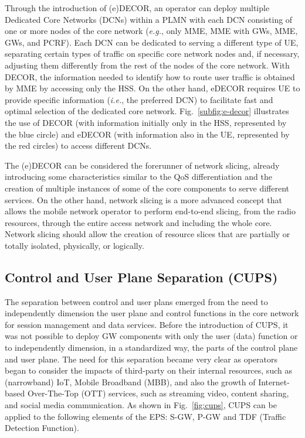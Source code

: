 Through the introduction of (e)DECOR, an operator can deploy multiple Dedicated Core Networks (DCNs) within a PLMN with each DCN consisting of one or more nodes of the core network (\textit{e.g.}, only MME, MME with GWs, MME, GWs, and PCRF). Each DCN can be dedicated to serving a different type of UE, separating certain types of traffic on specific core network nodes and, if necessary, adjusting them differently from the rest of the nodes of the core network. With DECOR, the information needed to identify how to route user traffic is obtained by MME by accessing only the HSS. On the other hand, eDECOR requires UE to provide specific information (\textit{i.e.}, the preferred DCN) to facilitate fast and optimal selection of the dedicated core network. Fig.~\ref{subfig:e-decor} illustrates the use of DECOR (with information initially only in the HSS, represented by the blue circle) and eDECOR (with information also in the UE, represented by the red circles) to access different DCNs.

The (e)DECOR can be considered the forerunner of network slicing, already introducing some characteristics similar to the QoS differentiation and the creation of multiple instances of some of the core components to serve different services. On the other hand, network slicing is a more advanced concept that allows the mobile network operator to perform end-to-end slicing, from the radio resources, through the entire access network and including the whole core. Network slicing should allow the creation of resource slices that are partially or totally isolated, physically, or logically.


\subsection*{Control and User Plane Separation (CUPS)}

The separation between control and user plans emerged from the need to independently dimension the user plane and control functions in the core network for session management and data services. Before the introduction of CUPS, it was not possible to deploy GW components with only the user (data) function or to independently dimension, in a standardized way, the parts of the control plane and user plane. The need for this separation became very clear as operators began to consider the impacts of third-party on their internal resources, such as (narrowband) IoT, Mobile Broadband (MBB), and also the growth of Internet-based Over-The-Top (OTT) services, such as streaming video, content sharing, and social media communication. As shown in Fig.~\ref{fig:cups}, CUPS can be applied to the following elements of the EPS: S-GW, P-GW and TDF (Traffic Detection Function).


